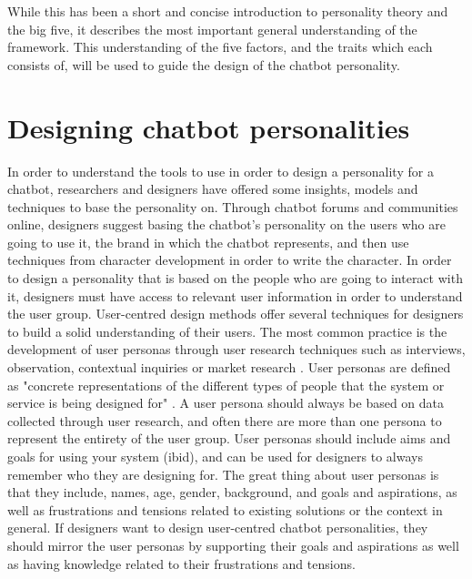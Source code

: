 \vspace{2,5mm}

While this has been a short and concise introduction to personality theory and the big five, it describes the most important general understanding of the framework. This understanding of the five factors, and the traits which each consists of, will be used to guide the design of the chatbot personality.

\vspace{5mm} %

\section{Designing chatbot personalities} 

In order to understand the tools to use in order to design a personality for a chatbot, researchers and designers have offered some insights, models and techniques to base the personality on. Through chatbot forums and communities online, designers suggest basing the chatbot's personality on the users who are going to use it, the brand in which the chatbot represents, and then use techniques from character development in order to write the character. In order to design a personality that is based on the people who are going to interact with it, designers must have access to relevant user information in order to understand the user group. User-centred design methods offer several techniques for designers to build a solid understanding of their users. The most common practice is the development of user personas through user research techniques such as interviews, observation, contextual inquiries or market research \citep{Courage2015}. User personas are defined as "concrete representations of the different types of people that the system or service is being designed for" \citep[: 55]{Benyon2014}. A user persona should always be based on data collected through user research, and often there are more than one persona to represent the entirety of the user group. User personas should include aims and goals for using your system (ibid), and can be used for designers to always remember who they are designing for. The great thing about user personas is that they include, names, age, gender, background, and goals and aspirations, as well as frustrations and tensions related to existing solutions or the context in general. If designers want to design user-centred chatbot personalities, they should mirror the user personas by supporting their goals and aspirations as well as having knowledge related to their frustrations and tensions.

